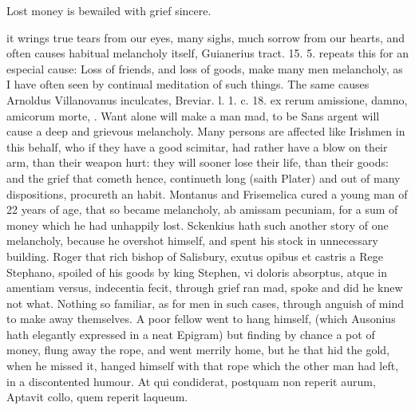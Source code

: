 {{Lost money is bewailed with grief sincere.

it wrings true tears from our eyes, many sighs, much sorrow from our
hearts, and often causes habitual melancholy itself, Guianerius tract.
15. 5. repeats this for an especial cause: Loss of friends, and
loss of goods, make many men melancholy, as I have often seen by
continual meditation of such things. The same causes Arnoldus
Villanovanus inculcates, Breviar. l. 1. c. 18. ex rerum amissione,
damno, amicorum morte, \etc{}. Want alone will make a man mad, to be Sans
argent will cause a deep and grievous melancholy. Many persons are
affected like  Irishmen in this behalf, who if they have a good
scimitar, had rather have a blow on their arm, than their weapon hurt:
they will sooner lose their life, than their goods: and the grief that
cometh hence, continueth long (saith Plater) and out of many
dispositions, procureth an habit. Montanus and Frisemelica cured
a young man of 22 years of age, that so became melancholy, ab amissam
pecuniam, for a sum of money which he had unhappily lost. Sckenkius
hath such another story of one melancholy, because he overshot himself,
and spent his stock in unnecessary building. Roger that rich
bishop of Salisbury, exutus opibus et castris a Rege Stephano, spoiled
of his goods by king Stephen, vi doloris absorptus, atque in amentiam
versus, indecentia fecit, through grief ran mad, spoke and did he knew
not what. Nothing so familiar, as for men in such cases, through
anguish of mind to make away themselves. A poor fellow went to hang
himself, (which Ausonius hath elegantly expressed in a neat
Epigram) but finding by chance a pot of money, flung away the
rope, and went merrily home, but he that hid the gold, when he missed
it, hanged himself with that rope which the other man had left, in a
discontented humour.
At qui condiderat, postquam non reperit aurum,
Aptavit collo, quem reperit laqueum.

}}
